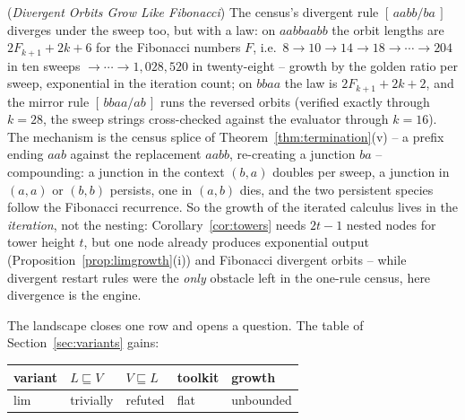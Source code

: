 \begin{remark}
    (\emph{Divergent Orbits Grow Like Fibonacci})
    \label{rem:fiborbit}
    The census's divergent rule $[\,aabb/ba\,]$ diverges under the sweep
    too, but with a law: on $aabbaabb$ the orbit lengths are
    $2F_{k+1} + 2k + 6$ for the Fibonacci numbers $F$, i.e.\ $8 \to 10
    \to 14 \to 18 \to \cdots \to 204$ in ten sweeps $\to \cdots \to
    1{,}028{,}520$ in twenty-eight -- growth by the golden ratio per
    sweep, exponential in the iteration count; on $bbaa$ the law is
    $2F_{k+1} + 2k + 2$, and the mirror rule $[\,bbaa/ab\,]$ runs the
    reversed orbits (verified exactly through $k = 28$, the sweep
    strings cross-checked against the evaluator through $k = 16$). The
    mechanism is the census splice of
    Theorem~\ref{thm:termination}(v) -- a prefix ending $aab$ against
    the replacement $aabb$, re-creating a junction $ba$ -- compounding:
    a junction in the context $(b, a)$ doubles per sweep, a junction in
    $(a, a)$ or $(b, b)$ persists, one in $(a, b)$ dies, and the two
    persistent species follow the Fibonacci recurrence. So the growth
    of the iterated calculus lives in the \emph{iteration}, not the
    nesting: Corollary~\ref{cor:towers} needs $2t-1$ nested nodes for
    tower height $t$, but one node already produces exponential output
    (Proposition~\ref{prop:limgrowth}(i)) and Fibonacci divergent
    orbits -- while divergent restart rules were the \emph{only}
    obstacle left in the one-rule census, here divergence is the
    engine.
\end{remark}

The landscape closes one row and opens a question. The table of
Section~\ref{sec:variants} gains:

\begin{center}
\footnotesize
\begin{tabular}{l|llll}
    variant & $L \sqsubseteq V$ & $V \sqsubseteq L$ & toolkit & growth \\
    \hline
    $\mathrm{lim}$ & trivially & refuted & flat & unbounded
\end{tabular}
\end{center}

